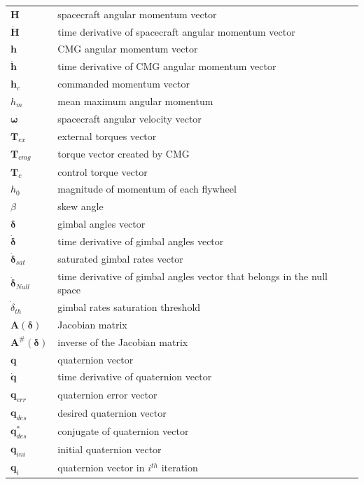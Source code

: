 \documentclass[journal]{new-aiaa}
\begin{document}
{\renewcommand\arraystretch{1.0}
\noindent\begin{longtable*}{@{}l @{\quad=\quad} l@{}}
$\textbf{H}$  & spacecraft angular momentum vector \\
$\dot{\textbf{H}}$ & time derivative of spacecraft angular momentum vector \\
$\textbf{h}$   & CMG angular momentum vector \\
$\dot{\textbf{h}}$ & time derivative of CMG angular momentum vector \\
$\textbf{h}_c$ & commanded momentum vector\\
$h_m$ & mean maximum angular momentum \\
$\boldsymbol{\omega}$& spacecraft angular velocity vector \\
$\textbf{T}_{ex}$ & external torques vector \\
$\textbf{T}_{cmg}$ & torque vector created by CMG \\
$\textbf{T}_c$ & control torque vector \\
$h_0$ & magnitude of momentum of each flywheel  \\
$\beta$   & skew angle \\
$\boldsymbol{\delta}$  & gimbal angles vector \\
$\dot{\boldsymbol{\delta}}$  & time derivative of gimbal angles vector  \\
$\dot{\boldsymbol{\delta}}_{sat}$ & saturated gimbal rates vector\\
$\dot{\boldsymbol{\delta}}_{Null}$ & time derivative of gimbal angles vector that belongs in the null space \\
$\dot{\delta}_{th}$ & gimbal rates saturation threshold\\
$\textbf{A}(\boldsymbol{\delta})$  & Jacobian matrix\\
$\textbf{A}^{\#}(\boldsymbol{\delta})$  & inverse of the Jacobian matrix\\
$\textbf{q}$ & quaternion vector\\
$\dot{\textbf{q}}$ & time derivative of quaternion vector\\
$\textbf{q}_{err}$ & quaternion error vector\\
$\textbf{q}_{des}$ & desired quaternion vector\\
$\textbf{q}^{*}_{des}$ & conjugate of quaternion vector\\
$\textbf{q}_{ini}$ & initial quaternion vector\\
$\textbf{q}_{i}$ & quaternion vector in $i^{th}$ iteration\\

\end{longtable*}}
\end{document}
